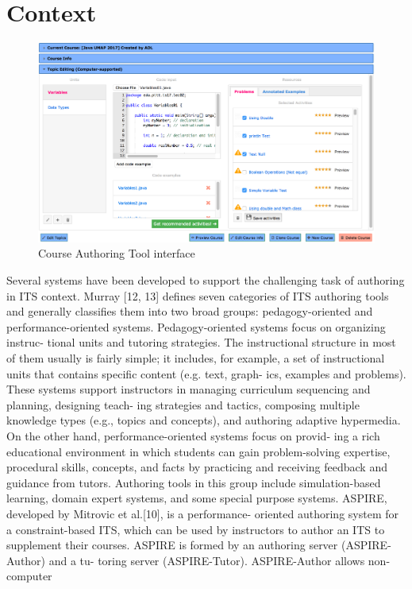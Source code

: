 \documentclass{sig-alternate}
\begin{document}
\section{Context}
\begin{figure}[b!]
\centering
\includegraphics[width=170mm]{obr3.png}
\caption{Course Authoring Tool interface}
\label{fig:fig2}
\end{figure}
Several systems have been developed to support the challenging
task of authoring in ITS context. Murray [12, 13] defines seven
categories of ITS authoring tools and generally classifies them into
two broad groups: pedagogy-oriented and performance-oriented
systems. Pedagogy-oriented systems focus on organizing instruc-
tional units and tutoring strategies. The instructional structure in
most of them usually is fairly simple; it includes, for example, a set
of instructional units that contains specific content (e.g. text, graph-
ics, examples and problems). These systems support instructors in
managing curriculum sequencing and planning, designing teach-
ing strategies and tactics, composing multiple knowledge types
(e.g., topics and concepts), and authoring adaptive hypermedia. On
the other hand, performance-oriented systems focus on provid-
ing a rich educational environment in which students can gain
problem-solving expertise, procedural skills, concepts, and facts
by practicing and receiving feedback and guidance from tutors.
Authoring tools in this group include simulation-based learning,
domain expert systems, and some special purpose systems.
ASPIRE, developed by Mitrovic et al.[10], is a performance-
oriented authoring system for a constraint-based ITS, which can be
used by instructors to author an ITS to supplement their courses.
ASPIRE is formed by an authoring server (ASPIRE-Author) and a tu-
toring server (ASPIRE-Tutor). ASPIRE-Author allows non-computer
\end{document}
